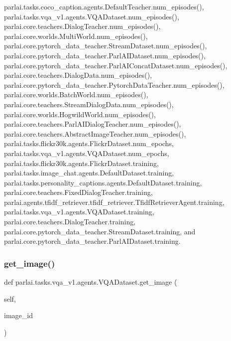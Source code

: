 parlai.\+tasks.\+coco\+\_\+caption.\+agents.\+Default\+Teacher.\+num\+\_\+episodes(), parlai.\+tasks.\+vqa\+\_\+v1.\+agents.\+V\+Q\+A\+Dataset.\+num\+\_\+episodes(), parlai.\+core.\+teachers.\+Dialog\+Teacher.\+num\+\_\+episodes(), parlai.\+core.\+worlds.\+Multi\+World.\+num\+\_\+episodes(), parlai.\+core.\+pytorch\+\_\+data\+\_\+teacher.\+Stream\+Dataset.\+num\+\_\+episodes(), parlai.\+core.\+pytorch\+\_\+data\+\_\+teacher.\+Parl\+A\+I\+Dataset.\+num\+\_\+episodes(), parlai.\+core.\+pytorch\+\_\+data\+\_\+teacher.\+Parl\+A\+I\+Concat\+Dataset.\+num\+\_\+episodes(), parlai.\+core.\+teachers.\+Dialog\+Data.\+num\+\_\+episodes(), parlai.\+core.\+pytorch\+\_\+data\+\_\+teacher.\+Pytorch\+Data\+Teacher.\+num\+\_\+episodes(), parlai.\+core.\+worlds.\+Batch\+World.\+num\+\_\+episodes(), parlai.\+core.\+teachers.\+Stream\+Dialog\+Data.\+num\+\_\+episodes(), parlai.\+core.\+worlds.\+Hogwild\+World.\+num\+\_\+episodes(), parlai.\+core.\+teachers.\+Parl\+A\+I\+Dialog\+Teacher.\+num\+\_\+episodes(), parlai.\+core.\+teachers.\+Abstract\+Image\+Teacher.\+num\+\_\+episodes(), parlai.\+tasks.\+flickr30k.\+agents.\+Flickr\+Dataset.\+num\+\_\+epochs, parlai.\+tasks.\+vqa\+\_\+v1.\+agents.\+V\+Q\+A\+Dataset.\+num\+\_\+epochs, parlai.\+tasks.\+flickr30k.\+agents.\+Flickr\+Dataset.\+training, parlai.\+tasks.\+image\+\_\+chat.\+agents.\+Default\+Dataset.\+training, parlai.\+tasks.\+personality\+\_\+captions.\+agents.\+Default\+Dataset.\+training, parlai.\+core.\+teachers.\+Fixed\+Dialog\+Teacher.\+training, parlai.\+agents.\+tfidf\+\_\+retriever.\+tfidf\+\_\+retriever.\+Tfidf\+Retriever\+Agent.\+training, parlai.\+tasks.\+vqa\+\_\+v1.\+agents.\+V\+Q\+A\+Dataset.\+training, parlai.\+core.\+teachers.\+Dialog\+Teacher.\+training, parlai.\+core.\+pytorch\+\_\+data\+\_\+teacher.\+Stream\+Dataset.\+training, and parlai.\+core.\+pytorch\+\_\+data\+\_\+teacher.\+Parl\+A\+I\+Dataset.\+training.

\mbox{\label{classparlai_1_1tasks_1_1vqa__v1_1_1agents_1_1VQADataset_a416fc9e62c61ffa6b56b9e63b5d56132}} 
\subsubsection{\texorpdfstring{get\+\_\+image()}{get\_image()}}
{\footnotesize\ttfamily def parlai.\+tasks.\+vqa\+\_\+v1.\+agents.\+V\+Q\+A\+Dataset.\+get\+\_\+image (\begin{DoxyParamCaption}\item[{}]{self,  }\item[{}]{image\+\_\+id }\end{DoxyParamCaption})}



